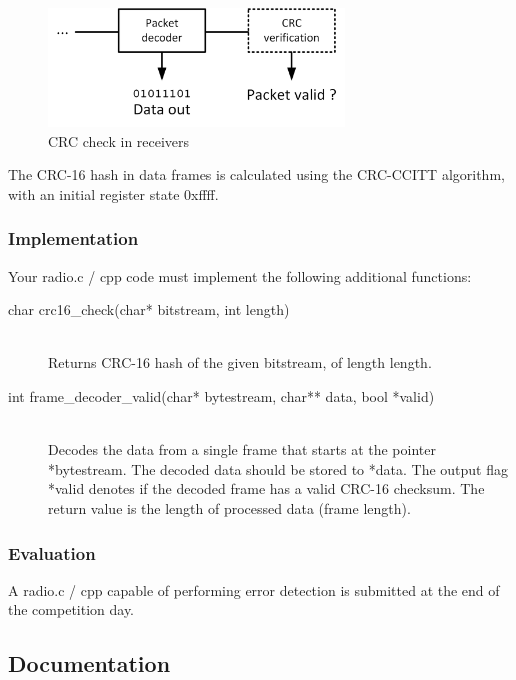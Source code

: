 \documentclass[openany]{book}
\begin{document}
	\begin{figure}[h!]
		\centering
		\includegraphics[width=0.7\textwidth]{Images/Task3.png}
		\caption{CRC check in receivers}
		\label{fig:task3}
	\end{figure}
	
	The CRC-16 hash in data frames is calculated using the CRC-CCITT algorithm, 
	with an initial register state \textsf{0xffff}.
	
	\subsubsection{Implementation}
	Your \textsf{radio.c / cpp} code must implement the following additional 
	functions:
	\begin{description}
		\item[char crc16\_check(char* bitstream, int length)]
		\,\\ Returns CRC-16 hash of the given \textsf{bitstream}, of length 
		\textsf{length}.
		\item[int frame\_decoder\_valid(char* bytestream, char** data, bool 
		*valid)]
		\,\\ Decodes the data from a single frame that starts at the pointer 
		\textsf{*bytestream}. The decoded data should be stored to 
		\textsf{*data}. The output flag \textsf{*valid} denotes if the decoded 
		frame has a valid CRC-16 checksum. The return value is the length of 
		processed data (frame length).
	\end{description}
	
	\subsubsection{Evaluation}
	
	A \textsf{radio.c / cpp} capable of performing error detection is submitted 
	at the end of the competition day.
	
	\subsection{Documentation}
	
\end{document}
